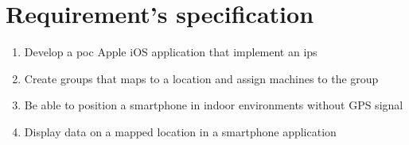 \chapter{Requirement's specification}\label{appendix:requirements}
\begin{enumerate}
	\item\label{req:developeApp}
	Develop a \acrlong{poc} Apple iOS application that implement an \acrlong{ips}

	\item\label{req:createGroups}
	Create groups that maps to a location and assign machines to the group 

	\item\label{req:positionDevice}
	Be able to position a smartphone in indoor environments without GPS signal 

	\item\label{req:displayData}
	Display data on a mapped location in a smartphone application
\end{enumerate}



